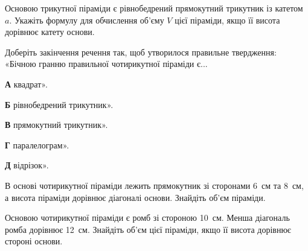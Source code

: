 \documentclass[12pt]{article}
\begin{document}
\begin{samepage}
\noindent\zadnum Основою трикутної піраміди є рівнобедрений прямокутний трикутник із катетом $a$. Укажіть формулу для обчислення об’єму $V$ цієї піраміди, якщо її висота дорівнює катету основи. 

\nmtnobreak
\nopagebreak\nbvspace{0.3cm}
\par{}
\end{samepage}

\begin{samepage}
\noindent\zadnum Доберіть закінчення речення так, щоб утворилося правильне твердження: «Бічною гранню правильної чотирикутної піраміди є... 

\nmtnobreak
\nopagebreak\nbvspace{0.3cm}
\noindent
\textbf{А} \quad квадрат».

\nmtnobreak
\noindent
\textbf{Б} \quad рівнобедрений трикутник».

\nmtnobreak
\noindent
\textbf{В} \quad прямокутний трикутник».

\nmtnobreak
\noindent
\textbf{Г} \quad паралелограм».

\nmtnobreak
\noindent
\textbf{Д} \quad відрізок».

\nmtnobreak
\nopagebreak\nbvspace{0.5cm}
\par{}\vspace{0.25cm}
\end{samepage}

\begin{samepage}
\noindent\zadnum В основі чотирикутної піраміди лежить прямокутник зі сторонами 6~см та 8~см, а висота піраміди дорівнює діагоналі основи. Знайдіть об’єм піраміди. 

\nmtnobreak
\nopagebreak\nbvspace{0.3cm}
\par{}
\end{samepage}

\begin{samepage}
\noindent\zadnum Основою чотирикутної піраміди є ромб зі стороною 10~см. Менша діагональ ромба дорівнює 12~см. Знайдіть об’єм цієї піраміди, якщо її висота дорівнює стороні основи. 

\nmtnobreak
\nopagebreak\nbvspace{0.3cm}
\par{}
\end{samepage}
\end{document}
